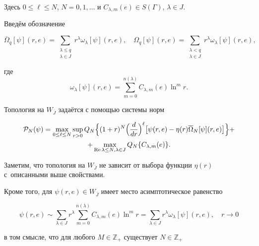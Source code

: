 Здесь $ 0\leq \ell \leq N$, $N=0, 1, \dots$ и $C_{\lambda,m}(e) \in S(\Gamma)$, $\lambda \in J.$ 

Введём обозначение

\begin{equation}

\label{droz:eq:1.6}

\overline{\Omega}_q[\psi](r,e)= \sum\limits_{\substack{ \lambda \leq q\\ \lambda \in J } }r^{\lambda} \omega_{\lambda}[\psi](r,e),\quad 

\Omega_q[\psi](r,e)= \sum_{\substack{  \lambda < q\\ \lambda \in J } }r^{\lambda} \omega_{\lambda}[\psi] (r,e), 

\end{equation}

где $$\omega_{\lambda}[\psi](r,e)=\sum_{m=0}^{n(\lambda)} C_{\lambda,m}(e)\ln^m r.$$

Топология на $W_{\bar{J}}$ задаётся с помощью системы норм

\begin{multline*} 

{\cal P}_N(\psi)=\max_{0\leq \ell \leq N} \sup_{r>0}

Q_N\Bigl\{ (1+r)^N \Bigr(\frac{d}{dr}\Bigl)^{\ell}\bigl[\psi(r,e)-\eta(r)

\overline{\Omega}_N[\psi](r,e)\bigr] \Bigr\} +\\

+\max_{{\rm Re\,} \lambda \leq N,\lambda \in J}Q_N\{C_{\lambda,m}(e)\}.

\end{multline*}

Заметим, что топология на $W_{\bar{J}}$ не зависит от выбора функции $\eta(r)$ с~описанными выше свойствами.

Кроме того, для $\psi(r,e) \in W_{\bar{J}}$ имеет место асимптотическое равенство

\begin{equation*}


\psi(r,e) \sim \sum_{\lambda \in J}r^{\lambda}\sum_{m=0}^{n(\lambda)} C_{\lambda,m}(e)\ln^m r=\sum_{\lambda \in J}r^{\lambda}\omega_{\lambda}[\psi](r,e),

\quad r\to 0

\end{equation*}

в том смысле, что для любого $M \in \mathbb Z_{+}$ существует $N \in \mathbb Z_{+}$

